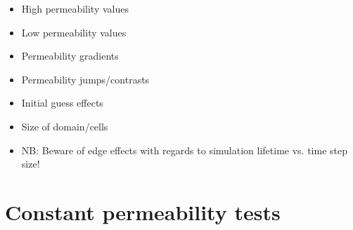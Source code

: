 \documentclass[a4paper,12pt]{report}
\begin{document}
\begin{itemize}
\item High permeability values 
\item Low permeability values
\item Permeability gradients
\item Permeability jumps/contrasts
\item Initial guess effects
\item Size of domain/cells
\item NB: Beware of edge effects with regards to simulation lifetime vs. time step size!
\end{itemize}

\clearpage

\section{Constant permeability tests}
\end{document}
